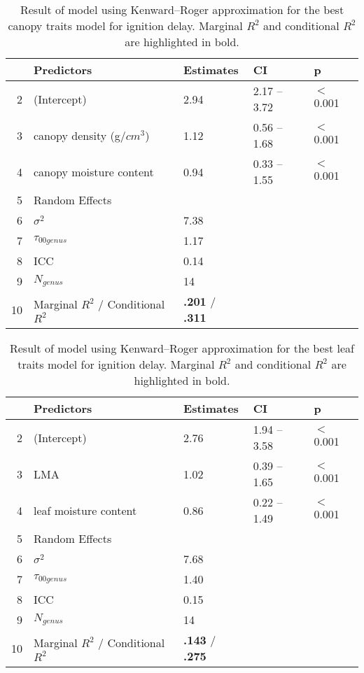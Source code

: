 \documentclass[12pt]{report}
\begin{document}
\begin{table}
\centering
\caption{Result of model using Kenward--Roger approximation for the best canopy traits model for ignition delay. Marginal $R^2$ and conditional $R^2$ are highlighted in bold.}
\begin{tabular}{rllll}
  \hline
 & Predictors & Estimates & CI & p \\ 
  \hline
2 & (Intercept) & 2.94 & 2.17 – 3.72 & $<$0.001 \\ 
  3 & canopy density (g/{$cm^3$}) & 1.12 & 0.56 – 1.68 & $<$0.001 \\ 
  4 & canopy moisture content & 0.94 & 0.33 – 1.55 & $<$0.001 \\ 
  5 & Random Effects &  &  &  \\ 
  6 & $\sigma^2$ & 7.38 &  &  \\ 
  7 & $\tau_{00 genus}$ & 1.17 &  &  \\ 
  8 & ICC & 0.14 &  &  \\ 
  9 & $N_{genus}$ & 14 &  &  \\ 
  10 & Marginal $R^2$ / Conditional $R^2$ & \textbf{.201} / \textbf{.311} &  &  \\ 
   \hline
\end{tabular}
\end{table}


\begin{table}[ht]
\centering
\caption{Result of model using Kenward--Roger approximation for the best leaf traits model for ignition delay. Marginal $R^2$ and conditional $R^2$ are highlighted in bold.}
\begin{tabular}{rllll}
  \hline
 & Predictors & Estimates & CI & p \\ 
  \hline
2 & (Intercept) & 2.76 & 1.94 – 3.58 & $<$0.001 \\ 
  3 & LMA & 1.02 & 0.39 – 1.65 & $<$0.001 \\ 
  4 & leaf moisture content & 0.86 & 0.22 – 1.49 & $<$0.001 \\ 
  5 & Random Effects &  &  &  \\ 
  6 & $\sigma^2$ & 7.68 &  &  \\ 
  7 & $\tau_{00 genus}$ & 1.40 &  &  \\ 
  8 & ICC & 0.15 &  &  \\ 
  9 & $N_{genus}$ & 14 &  &  \\ 
  10 & Marginal $R^2$ / Conditional $R^2$ & \textbf{.143} / \textbf{.275} &  &  \\ 
   \hline
\end{tabular}
\end{table}
\end{document}
